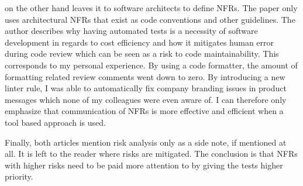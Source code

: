 \cite{Lagerstedt2014} on the other hand leaves it to software architects to define NFRs.
The paper only uses architectural NFRs that exist as code conventions and other guidelines.
The author describes why having automated tests is a necessity of software development in regards to cost efficiency and how it mitigates human error during code review which can be seen as a risk to code maintainability.
This corresponds to my personal experience. 
By using a code formatter, the amount of formatting related review comments went down to zero.
By introducing a new linter rule, I was able to automatically fix company branding issues in product messages which none of my colleagues were even aware of.
I can therefore only emphasize that communication of NFRs is more effective and  efficient when a tool based approach is used.


Finally, both articles mention risk analysis only as a side note, if mentioned at all.
It is left to the reader where risks are mitigated.
The conclusion is that NFRs with higher risks need to be paid more attention to by giving the tests higher priority.

